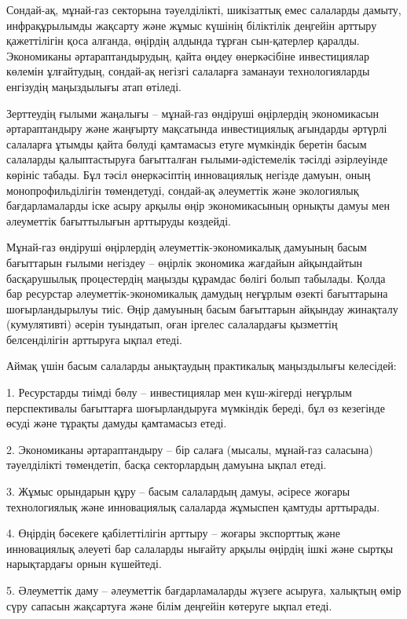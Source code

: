 Сондай-ақ, мұнай-газ секторына тәуелділікті, шикізаттық емес салаларды
дамыту, инфрақұрылымды жақсарту және жұмыс күшінің біліктілік деңгейін
арттыру қажеттілігін қоса алғанда, өңірдің алдында тұрған сын-қатерлер
қаралды. Экономиканы әртараптандырудың, қайта өңдеу өнеркәсібіне
инвестициялар көлемін ұлғайтудың, сондай-ақ негізгі салаларға заманауи
технологияларды енгізудің маңыздылығы атап өтіледі.

Зерттеудің ғылыми жаңалығы -- мұнай-газ өндіруші өңірлердің экономикасын
әртараптандыру және жаңғырту мақсатында инвестициялық ағындарды әртүрлі
салаларға ұтымды қайта бөлуді қамтамасыз етуге мүмкіндік беретін басым
салаларды қалыптастыруға бағытталған ғылыми-әдістемелік тәсілді
әзірлеуінде көрініс табады. Бұл тәсіл өнеркәсіптің инновациялық негізде
дамуын, оның монопрофильділігін төмендетуді, сондай-ақ әлеуметтік және
экологиялық бағдарламаларды іске асыру арқылы өңір экономикасының
орнықты дамуы мен әлеуметтік бағыттылығын арттыруды көздейді.

Мұнай-газ өндіруші өңірлердің әлеуметтік-экономикалық дамуының басым
бағыттарын ғылыми негіздеу -- өңірлік экономика жағдайын айқындайтын
басқарушылық процестердің маңызды құрамдас бөлігі болып табылады. Қолда
бар ресурстар әлеуметтік-экономикалық дамудың неғұрлым өзекті
бағыттарына шоғырландырылуы тиіс. Өңір дамуының басым бағыттарын
айқындау жинақталу (кумулятивті) әсерін туындатып, оған іргелес
салалардағы қызметтің белсенділігін арттыруға ықпал етеді.

Аймақ үшін басым салаларды анықтаудың практикалық маңыздылығы келесідей:

1. Ресурстарды тиімді бөлу -- инвестициялар мен күш-жігерді неғұрлым
перспективалы бағыттарға шоғырландыруға мүмкіндік береді, бұл өз
кезегінде өсуді және тұрақты дамуды қамтамасыз етеді.

2. Экономиканы әртараптандыру -- бір салаға (мысалы, мұнай-газ саласына)
тәуелділікті төмендетіп, басқа секторлардың дамуына ықпал етеді.

3. Жұмыс орындарын құру -- басым салалардың дамуы, әсіресе жоғары
технологиялық және инновациялық салаларда жұмыспен қамтуды арттырады.

4. Өңірдің бәсекеге қабілеттілігін арттыру -- жоғары экспорттық және
инновациялық әлеуеті бар салаларды нығайту арқылы өңірдің ішкі және
сыртқы нарықтардағы орнын күшейтеді.

5. Әлеуметтік даму -- әлеуметтік бағдарламаларды жүзеге асыруға, халықтың
өмір сүру сапасын жақсартуға және білім деңгейін көтеруге ықпал етеді.


